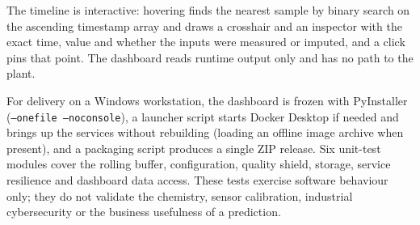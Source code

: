 The timeline is interactive: hovering finds the nearest sample by binary search on the ascending timestamp array and draws a crosshair and an inspector with the exact time, value and whether the inputs were measured or imputed, and a click pins that point. The dashboard reads runtime output only and has no path to the plant.

For delivery on a Windows workstation, the dashboard is frozen with PyInstaller (\texttt{--onefile --noconsole}), a launcher script starts Docker Desktop if needed and brings up the services without rebuilding (loading an offline image archive when present), and a packaging script produces a single ZIP release. Six unit-test modules cover the rolling buffer, configuration, quality shield, storage, service resilience and dashboard data access. These tests exercise software behaviour only; they do not validate the chemistry, sensor calibration, industrial cybersecurity or the business usefulness of a prediction.
